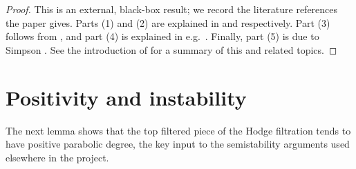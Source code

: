 \begin{proof}
  This is an external, black-box result; we record the literature references the
  paper gives. Parts (1) and (2) are explained in \cite[1.11--1.12]{deligne1987theoreme}
  and \cite[1.13]{deligne1987theoreme} respectively. Part (3) follows from
  \cite[B.3]{esnault1986logarithmic}, and part (4) is explained in
  e.g.\ \cite[Section 7]{brunebarbe2017semi}. Finally, part (5) is due to Simpson
  \cite[Theorem 5]{simpson1990harmonic}. See the introduction of
  \cite{arapura2019vanishing} for a summary of this and related topics.
\end{proof}

\section{Positivity and instability}

The next lemma shows that the top filtered piece of the Hodge filtration tends to
have positive parabolic degree, the key input to the semistability arguments used
elsewhere in the project.

